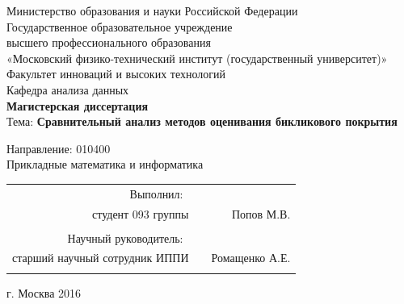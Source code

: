 \documentclass[a4paper]{article}
\begin{document}
\begin{titlepage}
	\begin{center}
		\hfill \break
		\large{Министерство образования и науки Российской Федерации}\\
		\hfill \break
		\normalsize{Государственное образовательное учреждение}\\ 
		\normalsize{высшего профессионального образования}\\
		\normalsize{«Московский физико-технический институт (государственный университет)»}\\
		\normalsize{Факультет инноваций и высоких технологий}\\
		\normalsize{Кафедра анализа данных}\\
		\hfill \break
		\hfill \break
		\hfill \break
		\Large{\textbf{Магистерская диссертация}}\\
		\hfill \break
		\large{Тема: \textbf{Сравнительный анализ методов оценивания бикликового покрытия}}\\
	\end{center}

	\begin{flushright}
		\hfill \break
		Направление:  010400\\
		Прикладные математика и информатика\\
		\hfill \break
	\end{flushright}
	
	\begin{flushright}
		\normalsize{
			\begin{tabular}{rcr}
				Выполнил:\ \\ студент 093 группы & \underline{\hspace{3cm}} & Попов М.В. \\\\
				Научный руководитель:\ \\ старший научный сотрудник ИППИ & \underline{\hspace{3cm}}& Ромащенко А.Е. \\\\
			\end{tabular}
		}
	\end{flushright}

	\begin{center}
		\hfill \break
	\end{center}

	\begin{center} г. Москва 2016 \end{center}
	\thispagestyle{empty}
\end{titlepage}
 
\end{document}
